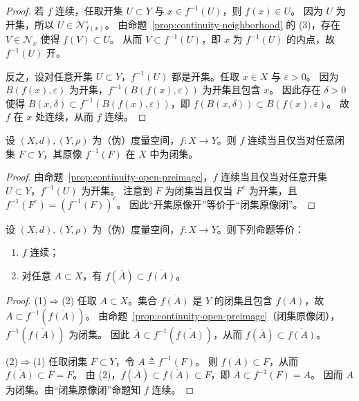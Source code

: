 \documentclass[lang=cn,a4paper,newtx,section]{elegantbook}
\begin{document}
\begin{proof}
  若 $f$ 连续，任取开集 $U\subset Y$ 与 $x\in f^{-1}(U)$，则 $f(x)\in U$。
  因为 $U$ 为开集，所以 $U\in\mathcal{N}_{f(x)}^\circ$。
  由命题~\ref{prop:continuity-neighborhood} 的 (3)，存在 $V\in\mathcal{N}_x$ 使得 $f(V)\subset U$。
  从而 $V\subset f^{-1}(U)$，即 $x$ 为 $f^{-1}(U)$ 的内点，故 $f^{-1}(U)$ 开。

  反之，设对任意开集 $U\subset Y$，$f^{-1}(U)$ 都是开集。任取 $x\in X$ 与 $\varepsilon>0$。
  因为 $B(f(x),\varepsilon)$ 为开集，$f^{-1}(B(f(x),\varepsilon))$ 为开集且包含 $x$。
  因此存在 $\delta>0$ 使得 $B(x,\delta)\subset f^{-1}(B(f(x),\varepsilon))$，即 $f(B(x,\delta))\subset B(f(x),\varepsilon)$。
  故 $f$ 在 $x$ 处连续，从而 $f$ 连续。
\end{proof}

\begin{proposition}
  设 $(X,d),(Y,\rho)$ 为（伪）度量空间，$f:X\to Y$。则 $f$ 连续当且仅当对任意闭集 $F\subset Y$，其原像 $f^{-1}(F)$ 在 $X$ 中为闭集。
\end{proposition}

\begin{proof}
  由命题~\ref{prop:continuity-open-preimage}，$f$ 连续当且仅当对任意开集 $U\subset Y$，$f^{-1}(U)$ 为开集。
  注意到 $F$ 为闭集当且仅当 $F^c$ 为开集，且 $f^{-1}(F^c)=(f^{-1}(F))^c$。
  因此“开集原像开”等价于“闭集原像闭”。
\end{proof}

\begin{proposition}\label{prop:continuity-closure-characterization}
  设 $(X,d),(Y,\rho)$ 为（伪）度量空间，$f:X\to Y$。则下列命题等价：
  \begin{enumerate}
    \item $f$ 连续；
    \item 对任意 $A\subset X$，有 $f(\overline{A})\subset \overline{f(A)}$。
  \end{enumerate}
\end{proposition}

\begin{proof}
  (1)$\Rightarrow$(2) 任取 $A\subset X$。集合 $\overline{f(A)}$ 是 $Y$ 的闭集且包含 $f(A)$，故 $A\subset f^{-1}(\overline{f(A)})$。
  由命题~\ref{prop:continuity-open-preimage}（闭集原像闭），$f^{-1}(\overline{f(A)})$ 为闭集。
  因此 $\overline{A}\subset f^{-1}(\overline{f(A)})$，从而 $f(\overline{A})\subset \overline{f(A)}$。

  (2)$\Rightarrow$(1) 任取闭集 $F\subset Y$，令 $A\triangleq f^{-1}(F)$。
  则 $f(A)\subset F$，从而 $\overline{f(A)}\subset \overline{F}=F$。
  由 (2)，$f(\overline{A})\subset \overline{f(A)}\subset F$，即 $\overline{A}\subset f^{-1}(F)=A$。
  因而 $A$ 为闭集。由“闭集原像闭”命题知 $f$ 连续。
\end{proof}
\end{document}
